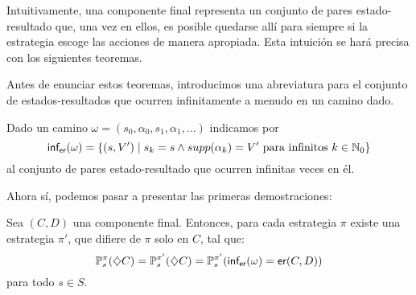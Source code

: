 Intuitivamente, una componente final representa un conjunto de pares
estado-resultado que, una vez en ellos, es posible quedarse allí para siempre
si la estrategia escoge las acciones de manera apropiada. Esta intuición se
hará precisa con los siguientes teoremas.

Antes de enunciar estos teoremas, introducimos una abreviatura para el conjunto
de estados-resultados que ocurren infinitamente a menudo en un camino dado. %

\begin{definition}[$\inft$]
	Dado un camino $\omega = (s_0, \alpha_0, s_1, \alpha_1, \dots)$ indicamos por
	\[
		\textsf{inf}_\textsf{er} (\omega) = \{(s, V') \mid s_k = s \wedge supp(\alpha_k) = V' \text{ para infinitos } k \in \mathbb{N}_0\}
	\]
	al conjunto de pares estado-resultado que ocurren infinitas veces en él.
\end{definition}

Ahora sí, podemos pasar a presentar las primeras demostraciones:

\begin{theorem}
	\label{teoEstabilidadEC}
	Sea $(C, D)$ una componente final. Entonces, para cada estrategia $\pi$ existe una estrategia $\pi'$, que difiere de $\pi$ solo en $C$, tal que:
	\begin{equation} \label{estabEC}
		\mathbb{P}^\pi_s(\diamondsuit C) = \mathbb{P}^{\pi'}_s(\diamondsuit C) = \mathbb{P}^{\pi'}_s(\textsf{inf}_\textsf{er}(\omega) = \textsf{er}(C,D))
	\end{equation}
	para todo $s \in S$.
\end{theorem}

